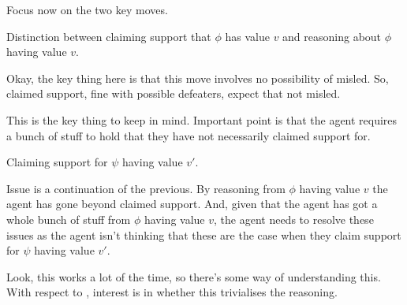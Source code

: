 \begin{note}
  Focus now on the two key moves.
\end{note}

\begin{note}
  Distinction between claiming support that \(\phi\) has value \(v\) and reasoning about \(\phi\) having value \(v\).

  Okay, the key thing here is that this move involves no possibility of misled.
  So, claimed support, fine with possible defeaters, expect that not misled.

  This is the key thing to keep in mind.
  Important point is that the agent requires a bunch of stuff to hold that they have not necessarily claimed support for.
\end{note}



\begin{note}
  Claiming support for \(\psi\) having value \(v'\).

  Issue is a continuation of the previous.
  By reasoning from \(\phi\) having value \(v\) the agent has gone beyond claimed support.
  And, given that the agent has got a whole bunch of stuff from \(\phi\) having value \(v\), the agent needs to resolve these issues as the agent isn't thinking that these are the case when they claim support for \(\psi\) having value \(v'\).

  Look, this works a lot of the time, so there's some way of understanding this.
  With respect to \nI{}, interest is in whether this trivialises the reasoning.
\end{note}


